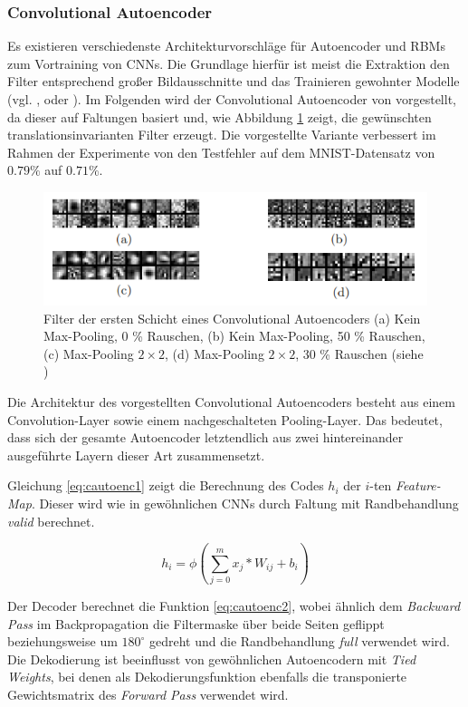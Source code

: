 \subsubsection{Convolutional Autoencoder}
\label{ch:autoenc}
Es existieren verschiedenste Architekturvorschläge für Autoencoder und RBMs zum Vortraining von CNNs. Die Grundlage hierfür ist meist die Extraktion den Filter entsprechend großer Bildausschnitte und das Trainieren gewohnter Modelle (vgl. \cite{Desjardins2008}, \cite{Ranzato2007} oder \cite{Lee2009}).  
Im Folgenden wird der Convolutional Autoencoder von \cite{Masci2011} vorgestellt, da dieser auf Faltungen basiert und, wie Abbildung \ref{fig:4_mascii} zeigt, die gewünschten translationsinvarianten Filter erzeugt. Die vorgestellte Variante verbessert im Rahmen der Experimente von \cite{Masci2011} den Testfehler auf dem MNIST-Datensatz von $0.79 \%$ auf $0.71 \%$.

\begin{figure}
\centering
\includegraphics[width=0.7\linewidth]{images/4_mascii}
\caption[]{Filter der ersten Schicht eines Convolutional Autoencoders (a) Kein Max-Pooling, 0 \% Rauschen, (b) Kein Max-Pooling, 50 \% Rauschen, (c) Max-Pooling $2 \times 2$, (d) Max-Pooling $2 \times 2$, 30 \% Rauschen (siehe \cite{Masci2011})}
\label{fig:4_mascii}
\end{figure}

Die Architektur des vorgestellten Convolutional Autoencoders besteht aus einem Convolution-Layer sowie einem nachgeschalteten Pooling-Layer. Das bedeutet, dass sich der gesamte Autoencoder letztendlich aus zwei hintereinander ausgeführte Layern dieser Art zusammensetzt.

Gleichung \ref{eq:cautoenc1} zeigt die Berechnung des Codes $h_i$ der $i$-ten \textit{Feature-Map}. Dieser wird wie in gewöhnlichen CNNs durch Faltung mit Randbehandlung \textit{valid} berechnet. 

\begin{equation}
\label{eq:cautoenc1} 
h_i = \phi(\sum_{j=0}^{m}  x_{j} \ast W_{ij} + b_i)
\end{equation}

Der Decoder berechnet die Funktion \ref{eq:cautoenc2}, wobei ähnlich dem \textit{Backward Pass} im Backpropagation die Filtermaske über beide Seiten geflippt beziehungsweise um $180^\circ$ gedreht und die Randbehandlung \textit{full} verwendet wird. Die Dekodierung ist beeinflusst von gewöhnlichen Autoencodern mit \textit{Tied Weights}, bei denen als Dekodierungsfunktion ebenfalls die transponierte Gewichtsmatrix des \textit{Forward Pass} verwendet wird.

